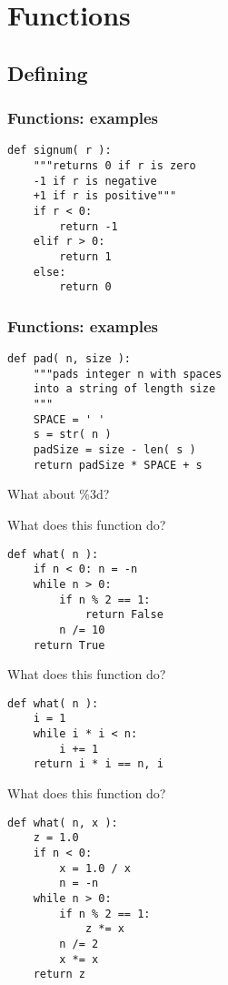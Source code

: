 \documentclass[14pt,compress]{beamer}
\begin{document}

\section{Functions}
\subsection{Defining}
\begin{frame}[fragile]
\frametitle{Functions: examples}
  \begin{lstlisting}
def signum( r ):
    """returns 0 if r is zero
    -1 if r is negative
    +1 if r is positive"""
    if r < 0:
        return -1
    elif r > 0:
        return 1
    else:
        return 0
  \end{lstlisting}
\end{frame}

\begin{frame}[fragile]
  \frametitle{Functions: examples}
  \begin{lstlisting}
def pad( n, size ): 
    """pads integer n with spaces
    into a string of length size
    """
    SPACE = ' '
    s = str( n )
    padSize = size - len( s )
    return padSize * SPACE + s
  \end{lstlisting}
\pause
What about \%3d?
\end{frame}

\begin{frame}[fragile]
  {What does this function do?}
  \begin{lstlisting}
def what( n ):
    if n < 0: n = -n
    while n > 0:
        if n % 2 == 1:
            return False
        n /= 10
    return True
  \end{lstlisting}
\end{frame}

\begin{frame}[fragile]
  {What does this function do?}
\begin{lstlisting}
def what( n ):
    i = 1    
    while i * i < n:
        i += 1
    return i * i == n, i
  \end{lstlisting}
\end{frame}

\begin{frame}[fragile]
  {What does this function do?}
  \begin{lstlisting}
def what( n, x ):
    z = 1.0
    if n < 0:
        x = 1.0 / x
        n = -n
    while n > 0:
        if n % 2 == 1:
            z *= x
        n /= 2
        x *= x
    return z
  \end{lstlisting}
\end{frame}
\end{document}

